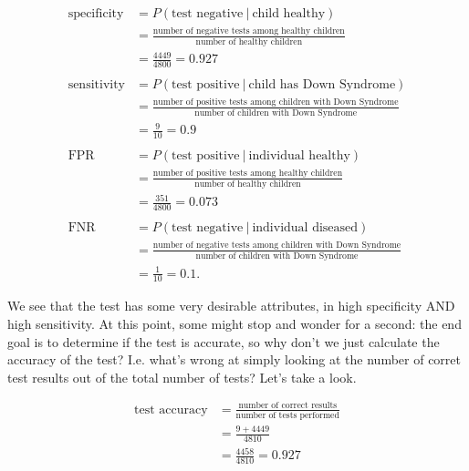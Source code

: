 \documentclass[]{book}
\theoremstyle{definition}
\theoremstyle{definition}
\theoremstyle{definition}
\theoremstyle{remark}
\begin{document}
\begin{align*}
  \text{specificity} &= P(\text{test negative}\ |\ \text{child healthy}) \\
                     &= \frac{\text{number of negative tests among healthy children}}{\text{number of healthy children}} \\
                     &= \frac{4449}{4800} = 0.927 \\
                     & \\
  \text{sensitivity} &= P(\text{test positive}\ |\ \text{child has Down Syndrome}) \\
                     &= \frac{\text{number of positive tests among children with Down Syndrome}}{\text{number of children with Down Syndrome}} \\
                     &= \frac{9}{10} = 0.9 \\
                     & \\
  \text{FPR} &= P(\text{test positive}\ |\ \text{individual healthy}) \\
             &= \frac{\text{number of positive tests among healthy children}}{\text{number of healthy children}} \\
             &= \frac{351}{4800} = 0.073 \\
             & \\
  \text{FNR} &= P(\text{test negative}\ |\ \text{individual diseased}) \\
             &= \frac{\text{number of negative tests among children with Down Syndrome}}{\text{number of children with Down Syndrome}} \\
             &= \frac{1}{10} = 0.1.
\end{align*}

We see that the test has some very desirable attributes, in high specificity AND high sensitivity. At this point, some might stop and wonder for a second: the end goal is to determine if the test is accurate, so why don't we just calculate the accuracy of the test? I.e. what's wrong at simply looking at the number of corret test results out of the total number of tests? Let's take a look.

\begin{align*}
  \text{test accuracy} &= \frac{\text{number of correct results}}{\text{number of tests performed}} \\
                       &= \frac{9 + 4449}{4810} \\
                       &= \frac{4458}{4810} = 0.927
\end{align*}
\end{document}
